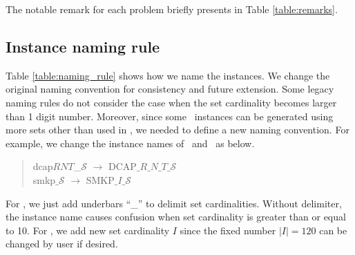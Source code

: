 The notable remark for each problem briefly presents in Table \ref{table:remarks}.

\begin{table}[H]
	\centering
\end{table}

\subsection{Instance naming rule}
Table \ref{table:naming_rule} shows how we name the instances. We change the original naming convention for consistency and future extension. Some legacy naming rules do not consider the case when the set cardinality becomes larger than 1 digit number. Moreover, since some \siplibtwo\ instances can be generated using more sets other than used in \siplib, we needed to define a new naming convention. For example, we change the instance names of \dcap\ and \smkp\ as below.
\begin{quote}
	\centering dcap$RNT$\_$\mathcal{S}$ $\longrightarrow$ DCAP$\_R\_N\_T\_\mathcal{S}$\\
	smkp$\_\mathcal{S}$ $\longrightarrow$ SMKP$\_I\_\mathcal{S}$
\end{quote}
For \dcap, we just add underbars ``\_'' to delimit set cardinalities. Without delimiter, the instance name causes confusion when set cardinality is greater than or equal to 10. For \smkp, we add new set cardinality $I$ since the fixed number $|I|=120$ can be changed by user if desired.

